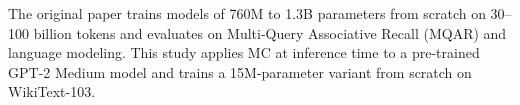 The original paper trains models of 760M to 1.3B parameters from
scratch on 30--100 billion tokens and evaluates on Multi-Query
Associative Recall (MQAR) and language modeling.
This study applies MC at inference time to a pre-trained GPT-2 Medium
model and trains a 15M-parameter variant from scratch on WikiText-103.
